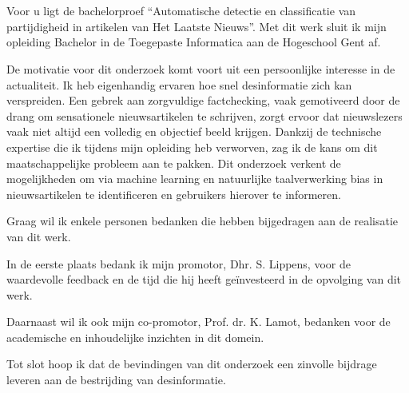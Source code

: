 \chapter*{}
\label{ch:voorwoord}

Voor u ligt de bachelorproef ``Automatische detectie en classificatie van partijdigheid in artikelen van Het Laatste Nieuws''. Met dit werk sluit ik mijn opleiding Bachelor in de Toegepaste Informatica aan de Hogeschool Gent af.

De motivatie voor dit onderzoek komt voort uit een persoonlijke interesse in de actualiteit. Ik heb eigenhandig ervaren hoe snel desinformatie zich kan verspreiden. Een gebrek aan zorgvuldige factchecking, vaak gemotiveerd door de drang om sensationele nieuwsartikelen te schrijven, zorgt ervoor dat nieuwslezers vaak niet altijd een volledig en objectief beeld krijgen. Dankzij de technische expertise die ik tijdens mijn opleiding heb verworven, zag ik de kans om dit maatschappelijke probleem aan te pakken. Dit onderzoek verkent de mogelijkheden om via machine learning en natuurlijke taalverwerking bias in nieuwsartikelen te identificeren en gebruikers hierover te informeren.

Graag wil ik enkele personen bedanken die hebben bijgedragen aan de realisatie van dit werk.

In de eerste plaats bedank ik mijn promotor, Dhr. S. Lippens, voor de waardevolle feedback en de tijd die hij heeft geïnvesteerd in de opvolging van dit werk.

Daarnaast wil ik ook mijn co-promotor, Prof. dr. K. Lamot, bedanken voor de academische en inhoudelijke inzichten in dit domein.

Tot slot hoop ik dat de bevindingen van dit onderzoek een zinvolle bijdrage leveren aan de bestrijding van desinformatie.